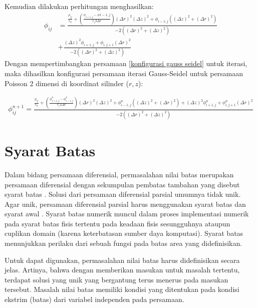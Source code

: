 Kemudian dilakukan perhitungan menghasilkan:
\begin{equation}
    \begin{split}
        \phi_{ij} &= \frac{\frac{\rho_{ij}}{\epsilon_0}+\left(\frac{\phi_{i+1,j}-\phi{1-1,j}}{r_i2\Delta r}\right)(\Delta r)^2 (\Delta z)^2 + \phi_{i-1,j}\left((\Delta z)^2+(\Delta r)^2\right)}{-2\left((\Delta r)^2 + (\Delta z)^2\right)}\\
        &+\frac{(\Delta z)^2 \phi_{i+1,j} + \phi_{i,j+1}(\Delta r)^2}{-2\left((\Delta r)^2 + (\Delta z)^2\right)}
    \end{split}
\end{equation}
Dengan mempertimbangkan persamaan \eqref{konfigurasi gauss seidel} untuk iterasi, maka dihasilkan konfigurasi persamaan iterasi Gauss-Seidel untuk persamaan Poisson 2 dimensi di koordinat silinder ($r,z$):

\begin{equation}\label{GS_silinder}
    \begin{split}
        \phi^{n+1}_{ij} = \frac{\frac{\rho_{ij}}{\epsilon_0}+\left(\frac{\phi^n_{i+1,j}-\phi^n_{i-1,j}}{r_i 2 \Delta r}\right)(\Delta r)^2(\Delta z)^2 + \phi^n_{i-1,j}((\Delta z)^2 + (\Delta r)^2) + (\Delta z)^2 \phi^n_{i+1,j} + \phi^n_{i,j+1}(\Delta r)^2}{-2((\Delta r)^2 + (\Delta z)^2)}
    \end{split}
\end{equation}

\section{Syarat Batas}

Dalam bidang persamaan diferensial, permasalahan nilai batas merupakan persamaan diferensial dengan sekumpulan pembatas tambahan yang disebut syarat batas \citep{zwilinger2022}. Solusi dari persamaan diferensial parsial umumnya tidak unik. Agar unik, persamaan diferensial parsial harus menggunakan syarat batas dan syarat awal \citep{waletPartial}. Syarat batas numerik muncul dalam proses implementasi numerik pada syarat batas fisis tertentu pada keadaan fisis sesungguhnya ataupun cuplikan domain (karena keterbatasan sumber daya komputasi)\citep{Brio2010}. Syarat batas menunjukkan perilaku dari sebuah fungsi pada batas area yang didefinisikan.

Untuk dapat digunakan, permasalahan nilai batas harus didefinisikan secara jelas. Artinya, bahwa dengan memberikan masukan untuk masalah tertentu, terdapat solusi yang unik yang bergantung terus menerus pada masukan tersebut. Masalah nilai batas memiliki kondisi yang ditentukan pada kondisi ekstrim (batas) dari variabel independen pada persamaan.
 
